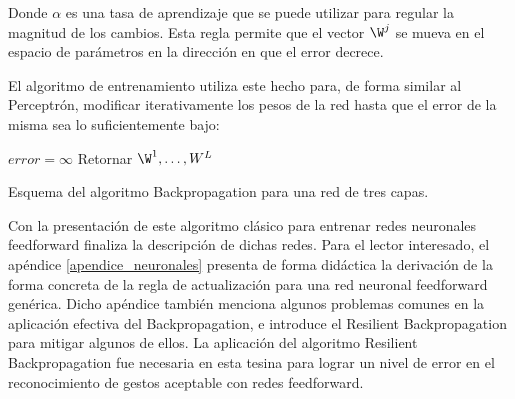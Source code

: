 
Donde $\alpha$ es una tasa de aprendizaje que se puede utilizar para regular la magnitud de los cambios. Esta regla permite que el vector $\W^j$ se mueva en el espacio de parámetros en la dirección en que el error decrece. 

El algoritmo de entrenamiento utiliza este hecho para, de forma similar al Perceptrón, modificar iterativamente los pesos de la red hasta que el error de la misma sea lo suficientemente bajo:

\begin{algorithm}[H]
$error=\infty$ \;
Retornar  $\W^1,\dots,W^L$ \;
\caption{Esquema del algoritmo Backpropagation para una red de tres capas.} 
\end{algorithm}
\vspace{10pt}


Con la presentación de este algoritmo clásico para entrenar redes neuronales feedforward finaliza la descripción de dichas redes. Para el lector interesado, el apéndice \ref{apendice_neuronales} presenta de forma didáctica la derivación de la forma concreta de la regla de actualización para una red neuronal feedforward genérica. Dicho apéndice también menciona algunos problemas comunes en la aplicación efectiva del Backpropagation, e introduce el Resilient Backpropagation para mitigar algunos de ellos. La aplicación del algoritmo Resilient Backpropagation fue necesaria en esta tesina para lograr un nivel de error en el reconocimiento de gestos aceptable con redes feedforward.  
